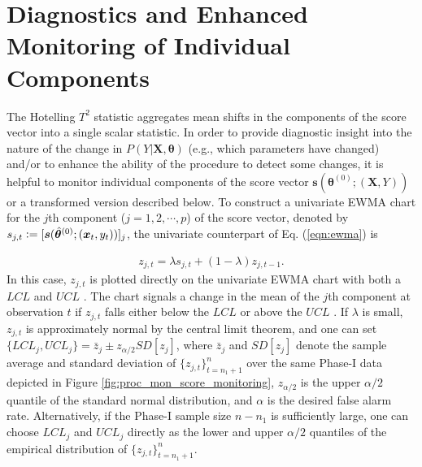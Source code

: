 \documentclass[twoside,11pt]{article}
\begin{document}
\section{Diagnostics and Enhanced Monitoring of Individual Components}
\label{s:decou_cd}
The Hotelling $T^2$ statistic aggregates mean shifts in the components of the score vector into a single scalar statistic. In order to provide diagnostic insight into the nature of the change in $P(Y| \bm {X}, \bm{\theta})$ (e.g., which parameters have changed) and/or to enhance the ability of the procedure to detect some changes, it is helpful to monitor individual components of the score vector $\bm{s}(\bm { \theta}^{ (0)}; (\bm {X}, Y))$ or a transformed version described below. To construct a univariate EWMA chart for the $j$th component ($j=1,2,\cdots,p$) of the score vector, denoted by $s_{j,t} \vcentcolon= [\bm{s}(\hat{\bm { \theta}}^{(0)};(\bm {x}_t, y_t))]_j$, the univariate counterpart of Eq. (\ref{eqn:ewma}) is

\begin{align}
z_{j,t} = \lambda s_{j,t} + (1 - \lambda) z_{j,t-1}.
\label{eqn:uniewma}
\end{align}
In this case, $z_{j,t}$ is plotted directly on the univariate EWMA chart with both a $LCL$ and $UCL$ . The chart signals a change in the mean of the $j$th component at observation $t$ if $z_{j,t}$ falls either below the $LCL$ or above the $UCL$ . If $\lambda$ is small, $z_{j,t}$ is approximately normal by the central limit theorem, and one can set  $\{LCL_j,UCL_j\} = \bar{z}_j \pm z_{\alpha/2}SD[z_j]$, where $\bar{z}_j$ and $SD[z_j]$ denote the sample average and standard deviation of $\{z_{j,t}\}_{t=n_1+1}^n$ over the same Phase-I data depicted in Figure \ref{fig:proc_mon_score_monitoring}, $z_{\alpha/2}$ is the upper $\alpha/2$ quantile of the standard normal distribution, and $\alpha$ is the desired false alarm rate. Alternatively, if the Phase-I sample size $n-n_1$ is sufficiently large, one can choose $LCL_j$ and $UCL_j$ directly as the lower and upper $\alpha/2$ quantiles of the empirical distribution of $\{z_{j,t}\}_{t=n_1+1}^n$. 
\end{document}
